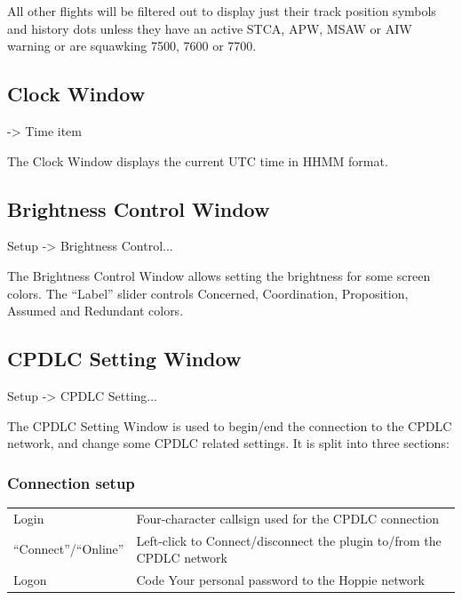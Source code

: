 \documentclass[a4paper,oneside,11pt]{memoir}
\begin{document}
\bigskip

All other flights will be filtered out to display just their track position symbols and history dots unless they have an active STCA, APW, MSAW or AIW warning or are squawking 7500, 7600 or 7700.

\subsection{Clock Window}\label{win:clock}

 -> Time item


The Clock Window displays the current UTC time in HHMM format.

\subsection{Brightness Control Window}
\label{win:bcw}

 Setup -> Brightness Control...

\bigskip


The Brightness Control Window allows setting the brightness for some screen colors. The “Label” slider controls Concerned, Coordination, Proposition, Assumed and Redundant colors.

\subsection{CPDLC Setting Window}
\label{win:dls}

 Setup -> CPDLC Setting...


The CPDLC Setting Window is used to begin/end the connection to the CPDLC network, and change some CPDLC related settings. It is split into three sections:

\subsubsection*{Connection setup}

\begin{longtable}{p{2.5cm} p{10cm}}
  Login               & Four-character callsign used for the CPDLC connection\\
  “Connect”/“Online”  & Left-click to Connect/disconnect the plugin to/from the CPDLC network\\
  Logon               & Code Your personal password to the Hoppie network\\
\end{longtable}
\end{document}
